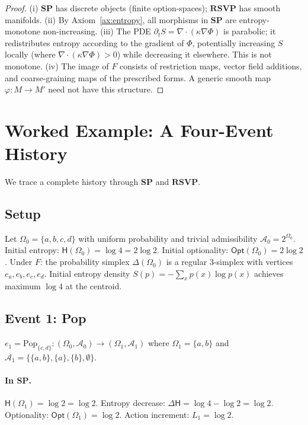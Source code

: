 \documentclass[12pt,a4paper]{article}
\theoremstyle{definition}
\theoremstyle{remark}
\newcommand{\Ent}{\mathsf{H}}
\newcommand{\Opt}{\mathsf{Opt}}
\newcommand{\SP}{\mathbf{SP}}
\newcommand{\RSVP}{\mathbf{RSVP}}
\newcommand{\Pop}{\mathrm{Pop}}
\newcommand{\PhiF}{\Phi}
\newcommand{\SF}{S}
\begin{document}
\begin{proof}
(i) $\SP$ has discrete objects (finite option-spaces); $\RSVP$ has smooth manifolds.
(ii) By Axiom~\ref{ax:entropy}, all morphisms in $\SP$ are entropy-monotone non-increasing.
(iii) The PDE $\partial_t\SF=\nabla\cdot(\kappa\nabla\PhiF)$ is parabolic; it
redistributes entropy according to the gradient of $\PhiF$, potentially increasing
$\SF$ locally (where $\nabla\cdot(\kappa\nabla\PhiF)>0$) while decreasing it elsewhere.
This is not monotone. (iv) The image of $F$ consists of restriction maps, vector field
additions, and coarse-graining maps of the prescribed forms. A generic smooth map
$\varphi:M\to M'$ need not have this structure.
\end{proof}

\section{Worked Example: A Four-Event History}
\label{sec:worked}

We trace a complete history through $\SP$ and $\RSVP$.

\subsection{Setup}

Let $\Omega_0=\{a,b,c,d\}$ with uniform probability and trivial admissibility
$\mathcal{A}_0=2^{\Omega_0}$. Initial entropy: $\Ent(\Omega_0)=\log 4=2\log 2$.
Initial optionality: $\Opt(\Omega_0)=2\log 2$. Under $F$: the probability simplex
$\Delta(\Omega_0)$ is a regular 3-simplex with vertices $e_a,e_b,e_c,e_d$.
Initial entropy density $\SF(p)=-\sum_x p(x)\log p(x)$ achieves maximum $\log 4$
at the centroid.

\subsection{Event 1: Pop}

$e_1=\Pop_{\{c,d\}}:(\Omega_0,\mathcal{A}_0)\to(\Omega_1,\mathcal{A}_1)$
where $\Omega_1=\{a,b\}$ and $\mathcal{A}_1=\{\{a,b\},\{a\},\{b\},\emptyset\}$.

\paragraph{In $\SP$.}
$\Ent(\Omega_1)=\log 2=\log 2$. Entropy decrease: $\Delta\Ent=\log 4-\log 2=\log 2$.
Optionality: $\Opt(\Omega_1)=\log 2$. Action increment: $L_1=\log 2$.
\end{document}
